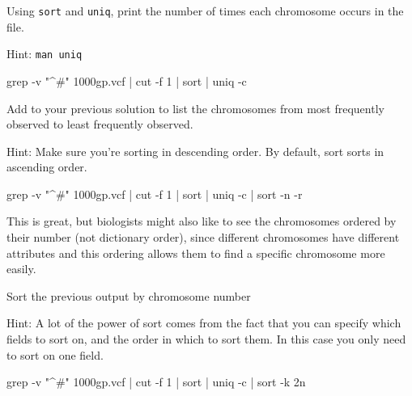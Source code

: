 \begin{questions}
Using \texttt{sort} and \texttt{uniq}, print the number of times each chromosome occurs in the file.

Hint: \texttt{man uniq}
\begin{answer}
grep -v "^#" 1000gp.vcf | cut -f 1 | sort | uniq -c
\end{answer}
Add to your previous solution to list the chromosomes from most frequently observed to least frequently observed.

Hint: Make sure you're sorting in descending order. By default, sort sorts in ascending order.
\begin{answer}
grep -v "^#" 1000gp.vcf | cut -f 1 | sort | uniq -c | sort -n -r
\end{answer}
\end{questions}


\begin{note}
This is great, but biologists might also like to see the chromosomes ordered by their number (not dictionary order), since different chromosomes have different attributes and this ordering allows them to find a specific chromosome more easily.
\end{note}
\begin{questions}
Sort the previous output by chromosome number

Hint: A lot of the power of sort comes from the fact that you can specify which fields to sort on, and the order in which to sort them. In this case you only need to sort on one field.
\begin{answer}
grep -v "^#" 1000gp.vcf | cut -f 1 | sort | uniq -c | sort -k 2n
\end{answer}
\end{questions}
